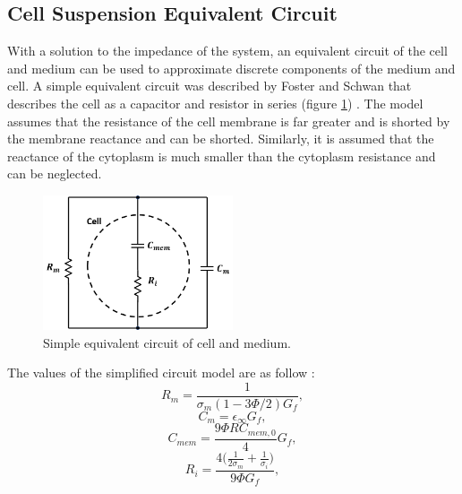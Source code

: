  \subsection{Cell Suspension Equivalent Circuit}
 
 \par With a solution to the impedance of the system, an equivalent circuit of the cell and medium can be used to approximate discrete components of the medium and cell. A simple equivalent circuit was described by Foster and Schwan that describes the cell as a capacitor and resistor in series (figure \ref{fig:simple_equiv_circuit_cell_medium}) \cite{schwan_electrical_1994}. The model assumes that the resistance of the cell membrane is far greater and is shorted by the membrane reactance and can be shorted. Similarly, it is assumed that the reactance of the cytoplasm is much smaller than the cytoplasm resistance and can be neglected.
 
 \begin{figure}
     \centering
     \includegraphics[width=0.5\textwidth]{images/simpleCellMediumCircuit.png}
     \caption{Simple equivalent circuit of cell and medium.}
     \label{fig:simple_equiv_circuit_cell_medium}
 \end{figure}
 
 \noindent The values of the simplified circuit model are as follow \cite{morgan_single_2007}:
 \begin{equation}
     R_m = \frac{1}{\sigma_m(1-3\Phi/2)G_f},
 \end{equation}
 \begin{equation}
     C_m = \epsilon_\infty G_f,
 \end{equation}
 \begin{equation}
     C_{mem} = \frac{9\Phi RC_{mem,0}}{4}G_f,
 \end{equation}
 \begin{equation}
     R_i = \frac{4\Big(\frac{1}{2\sigma_m}+\frac{1}{\sigma_i}\Big)}{9\Phi G_f},
 \end{equation}
 
